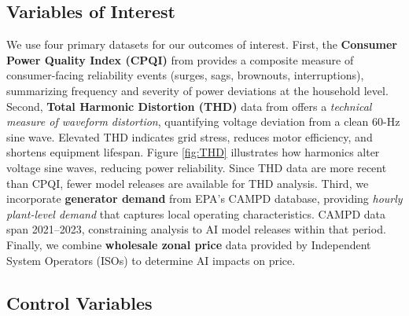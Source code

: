 \documentclass[sigconf]{acmart}
\begin{document}
\subsection{Variables of Interest}

We use four primary datasets for our outcomes of interest. First, the \textbf{Consumer Power Quality Index (CPQI)} from \cite{WhiskerLabs_THD_2024} provides a composite measure of consumer-facing reliability events (surges, sags, brownouts, interruptions), summarizing frequency and severity of power deviations at the household level. Second, \textbf{Total Harmonic Distortion (THD)} data from \cite{WhiskerLabs_THD_2024} offers a \emph{technical measure of waveform distortion}, quantifying voltage deviation from a clean 60-Hz sine wave. Elevated THD indicates grid stress, reduces motor efficiency, and shortens equipment lifespan. Figure \ref{fig:THD} illustrates how harmonics alter voltage sine waves, reducing power reliability. Since THD data are more recent than CPQI, fewer model releases are available for THD analysis. Third, we incorporate \textbf{generator demand} from EPA's CAMPD database, providing \emph{hourly plant-level demand} that captures local operating characteristics. CAMPD data span 2021--2023, constraining analysis to AI model releases within that period. Finally, we combine \textbf{wholesale zonal price} data provided by Independent System Operators (ISOs) to determine AI impacts on price.
\subsection{Control Variables}
\end{document}
